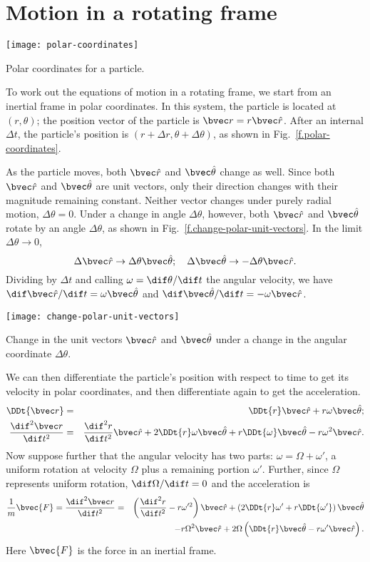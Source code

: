 \section{Motion in a rotating frame}

\begin{marginfigure}[-4\baselineskip]
\texttt{[image: polar-coordinates]}
\caption[Polar coordinates]{Polar coordinates for a particle.
\label{f.polar-coordinates}}
\end{marginfigure}
To work out the equations of motion in a rotating frame, we start from an inertial frame in polar coordinates.  In this system, the particle is located at $(r,\theta)$; the position vector of the particle is $\rv = r\rhat$. After an internal $\Delta t$, the particle's position is $(r+\Delta r,\theta+\Delta\theta)$, as shown in Fig.~\ref{f.polar-coordinates}.  

As the particle moves, both $\rhat$ and $\thetahat$ change as well.  Since both $\rhat$ and $\thetahat$ are unit vectors, only their direction changes with their magnitude remaining constant. Neither vector changes under purely radial motion, $\Delta\theta = 0$.  Under a change in angle $\Delta\theta$, however, both $\rhat$ and $\thetahat$ rotate by an angle $\Delta\theta$, as shown in Fig.~\ref{f.change-polar-unit-vectors}. In the limit $\Delta\theta \to 0$, 
\[ \Delta \rhat \to \Delta\theta \thetahat; \quad \Delta\thetahat \to -\Delta\theta\rhat. \]
Dividing by $\Delta t$ and calling $\omega = \dif\theta/\dif t$ the angular velocity, we have
$\dif\rhat/\dif t = \omega\thetahat$ and $\dif\thetahat/\dif t = -\omega\rhat$.

\begin{marginfigure}[-4\baselineskip]
\texttt{[image: change-polar-unit-vectors]}
\caption[Change in unit vectors under rotation]{Change in the unit vectors $\rhat$ and $\thetahat$ under a change in the angular coordinate $\Delta\theta$.
\label{f.change-polar-unit-vectors}}
\end{marginfigure}

We can then differentiate the particle's position with respect to time to get its velocity in polar coordinates, and then differentiate again to get the acceleration.
\begin{eqnarray}
\DDt{\rv} &=& \DDt{r}\rhat + r\omega\thetahat; \\
\DDtt{\rv} &=& \DDtt{r}\rhat + 2\DDt{r}\omega\thetahat + r \DDt{\omega}\thetahat - r\omega^{2}\rhat.
\label{e.accel-polar}
\end{eqnarray}
Now suppose further that the angular velocity has two parts: $\omega = \Omega+\omega'$, a uniform rotation at velocity $\Omega$ plus a remaining portion $\omega'$.  Further, since $\Omega$ represents uniform rotation, $\dif\Omega/\dif t = 0$ and the acceleration is
\begin{eqnarray}
\frac{1}{m}\bvec{F} = \DDtt{\rv} &=& \left(\DDtt{r} - r\omega'^{2}\right)\rhat + \left(2\DDt{r}\omega' + r\DDt{\omega'}\right)\thetahat\nonumber\\
 && -r\Omega^{2}\rhat + 2\Omega\left(\DDt{r}\thetahat - r\omega'\rhat\right).
\label{e.full-accel}
\end{eqnarray}
Here $\bvec{F}$ is the force in an inertial frame.

